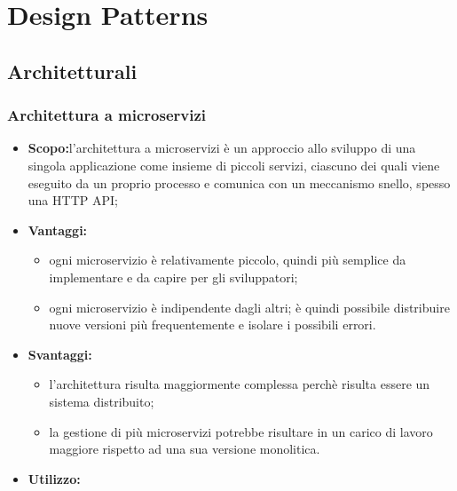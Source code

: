 \section{Design Patterns}
  \subsection{Architetturali}
    \subsubsection{Architettura a microservizi}
      \begin{itemize}
       \item \textbf{Scopo:}l'architettura a microservizi è un approccio allo sviluppo di una singola applicazione come insieme di piccoli servizi, ciascuno dei quali viene eseguito da un proprio processo e comunica con un meccanismo snello, spesso una HTTP API;
       \item \textbf{Vantaggi:}
	      \begin{itemize}
	       \item ogni microservizio è relativamente piccolo, quindi più semplice da implementare e da capire per gli sviluppatori;
	       \item ogni microservizio è indipendente dagli altri; è quindi possibile distribuire nuove versioni più frequentemente e isolare i possibili errori.
	      \end{itemize}

       \item \textbf{Svantaggi:}
	\begin{itemize}
	 \item l'architettura risulta maggiormente complessa perchè risulta essere un sistema distribuito;
	 \item la gestione di più microservizi potrebbe risultare in un carico di lavoro maggiore rispetto ad una sua versione monolitica.
	\end{itemize}
       \item \textbf{Utilizzo:}
      \end{itemize}
      

